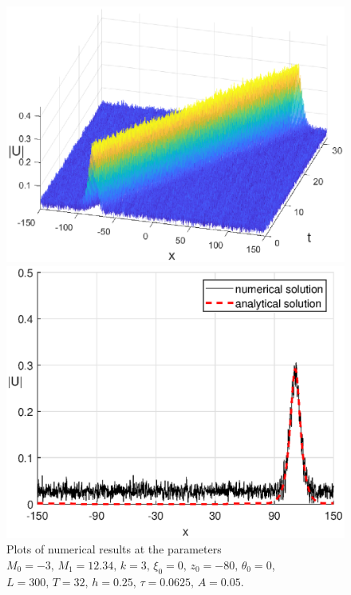 \documentclass[preprint,12pt]{elsarticle}
\begin{document}
\begin{figure}[H] %
\begin{center}
\begin{minipage}[h]{0.48\linewidth}
\includegraphics[width=1\linewidth]{fig46.eps}
\end{minipage}
\hfill
\begin{minipage}[h]{0.48\linewidth}
\includegraphics[width=1\linewidth]{fig47.eps}
\end{minipage}
\end{center}
\caption{Plots of numerical results at the parameters \(M_{0}=-3,\,M_{1}=12.34,\, k=3,\, \xi_{0}=0,\,z_{0}=-80,\, \theta_{0}=0\), \\
\(L=300,\, T=32,\, h=0.25,\, \tau=0.0625,\,A=0.05\).}
\label{fig172}
\end{figure}
\end{document}
